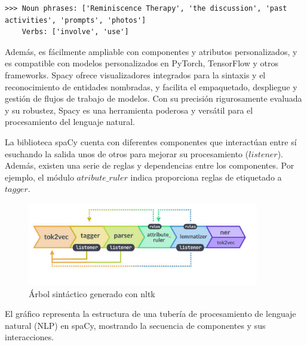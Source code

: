 \begin{lstlisting}[style=SpyderStyle, caption={Resultado de tokenización usando spaCy}, captionpos=b, label={lst:python},breaklines = true]
>>> Noun phrases: ['Reminiscence Therapy', 'the discussion', 'past activities', 'prompts', 'photos']
	Verbs: ['involve', 'use']
\end{lstlisting}

Además, es fácilmente ampliable con componentes y atributos personalizados, y es compatible con modelos personalizados en PyTorch, TensorFlow y otros frameworks. Spacy ofrece visualizadores integrados para la sintaxis y el reconocimiento de entidades nombradas, y facilita el empaquetado, despliegue y gestión de flujos de trabajo de modelos. Con su precisión rigurosamente evaluada y su robustez, Spacy es una herramienta poderosa y versátil para el procesamiento del lenguaje natural.

La biblioteca spaCy cuenta con diferentes componentes que interactúan entre sí esuchando la salida unos de otros para mejorar su procesamiento ($listener$). Además, existen una serie de reglas y dependencias entre los componentes. Por ejemplo, el módulo $atribute\_ruler$ indica proporciona reglas de etiquetado a $tagger$.

\begin{figure}[h]
	\centering
	\includegraphics[width=0.9\textwidth]{Imagenes/spaCy}
	\caption{Árbol sintáctico generado con nltk}
	\label{fig:1}
\end{figure}

El gráfico representa la estructura de una tubería de procesamiento de lenguaje natural (NLP) en spaCy, mostrando la secuencia de componentes y sus interacciones.

